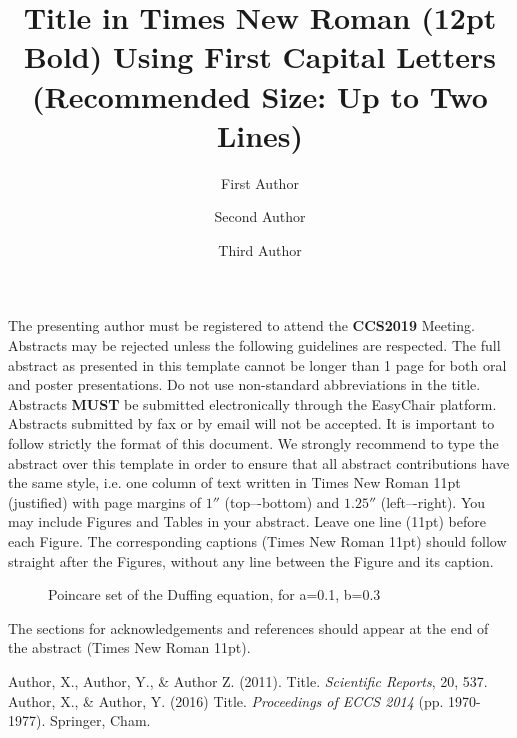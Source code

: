 \documentclass[11pt, a4paper]{article}
\begin{document}
\title{\vspace{-3.0cm}\large\textbf{Title in Times New Roman (12pt Bold) Using First Capital Letters \\(Recommended Size: Up to Two Lines)}}

\author[1]{\footnotesize First Author}
\author[2]{\footnotesize Second Author}
\author[1,2]{\footnotesize Third Author}
\date{\vspace{-5ex}}

\maketitle
\thispagestyle{empty}

\noindent
The presenting author must be registered to attend the \textbf{CCS2019} Meeting. 
Abstracts may be rejected unless the following guidelines are respected. 
The full abstract as presented in this template cannot be longer than 1 page for both oral and poster presentations. 
Do not use non-standard abbreviations in the title. 
Abstracts \textbf{MUST} be submitted electronically through the EasyChair platform. 
Abstracts submitted by fax or by email will not be accepted. 
It is important to follow strictly the format of this document. 
We strongly recommend to type the abstract over this template in order to ensure that all abstract contributions have the same style, i.e. one column of text written in Times New Roman 11pt (justified) with page margins of $1''$ (top–-bottom) and $1.25''$ (left–-right). 
You may include Figures and Tables in your abstract. 
Leave one line (11pt) before each Figure. 
The corresponding captions (Times New Roman 11pt) should follow straight after the Figures, without any line between the Figure and its caption.

\begin{figure}[!htp]
  \centering
  \caption{Poincare set of the Duffing equation, for a=0.1, b=0.3}\label{fig:1}
\end{figure}

\noindent
The sections for acknowledgements and references should appear at the end of the abstract (Times New Roman 11pt).


\begin{thebibliography}{9}
Author, X., Author, Y., \& Author Z. (2011). Title. \emph{Scientific Reports}, 20, 537.
Author, X., \& Author, Y. (2016) Title. \emph{Proceedings of ECCS 2014} (pp. 1970-1977). Springer, Cham.
\end{thebibliography}
\end{document}
